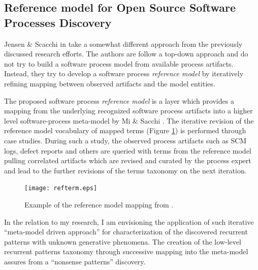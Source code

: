 \subsection{Reference model for Open Source Software Processes Discovery}
Jensen \& Scacchi in \cite{citeulike:5043664} take a somewhat different approach from the previously discussed research efforts. The authors are follow a top-down approach and do not try to build a software process model from available process artifacts. Instead, they try to develop a software process \textit{reference model} by iteratively refining mapping between observed artifacts and the model entities. 

The proposed software process \textit{reference model} is a layer which provides a mapping from the underlying recognized software process artifacts into a higher level software-process meta-model by Mi \& Sacchi \cite{citeulike:5128872}. The iterative revision of the reference model vocabulary of mapped terms (Figure \ref{fig:refterm}) is performed through case studies. During such a study, the observed process artifacts such as SCM logs, defect reports and others are queried with terms from the reference model pulling correlated artifacts which are revised and curated by the process expert and lead to the further revisions of the terms taxonomy on the next iteration.

\begin{figure}[tbp]
   \centering
   \texttt{[image: refterm.eps]}
   \caption{Example of the reference model mapping from \cite{citeulike:5043664}.}
   \label{fig:refterm}
\end{figure}

In the relation to my research, I am envisioning the application of such iterative ``meta-model driven approach'' for characterization of the discovered recurrent patterns with unknown generative phenomena. The creation of the low-level recurrent patterns taxonomy through successive mapping into the meta-model assures from a ``nonsense patterns'' discovery.

